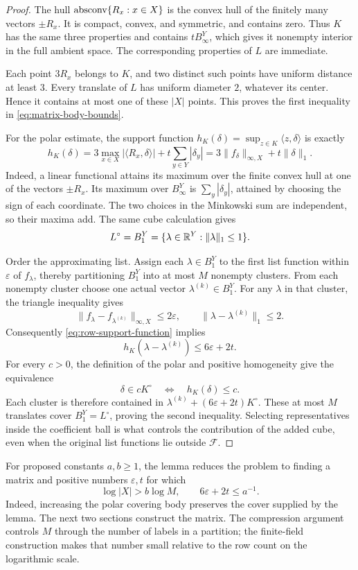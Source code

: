\begin{proof}
The hull $\operatorname{absconv}\{R_x:x\in X\}$ is the convex hull of the
finitely many vectors $\pm R_x$.  It is compact, convex, and symmetric,
and contains zero.  Thus $K$ has the same three properties and contains
$tB_\infty^Y$, which gives it nonempty interior in the full ambient
space.  The corresponding properties of $L$ are immediate.

Each point $3R_x$ belongs to $K$, and two distinct such points have
uniform distance at least $3$.  Every translate of $L$ has uniform
diameter $2$, whatever its center.  Hence it contains at most one of
these $|X|$ points.  This proves the first inequality in
\eqref{eq:matrix-body-bounds}.

For the polar estimate, the support function
$h_K(\delta)=\sup_{z\in K}\langle z,\delta\rangle$ is exactly
\begin{equation}
\label{eq:row-support-function}
 h_K(\delta)
 =3\max_{x\in X}|\langle R_x,\delta\rangle|
     +t\sum_{y\in Y}|\delta_y|
 =3\|f_\delta\|_{\infty,X}+t\|\delta\|_1.
\end{equation}
Indeed, a linear functional attains its maximum over the finite convex
hull at one of the vectors $\pm R_x$.  Its maximum over
$B_\infty^Y$ is $\sum_y|\delta_y|$, attained by choosing the sign of
each coordinate.  The two choices in the Minkowski sum are independent,
so their maxima add.  The same cube calculation gives
\[
 L^\circ=B_1^Y=\{\lambda\in\mathbb R^Y:\|\lambda\|_1\le1\}.
\]

Order the approximating list.  Assign each $\lambda\in B_1^Y$ to the
first list function within $\varepsilon$ of $f_\lambda$, thereby
partitioning $B_1^Y$ into at most $M$ nonempty clusters.  From each
nonempty cluster choose one actual vector $\lambda^{(k)}\in B_1^Y$.
For any $\lambda$ in that cluster, the triangle inequality gives
\[
 \|f_\lambda-f_{\lambda^{(k)}}\|_{\infty,X}
 \le2\varepsilon,
 \qquad
 \|\lambda-\lambda^{(k)}\|_1\le2.
\]
Consequently \eqref{eq:row-support-function} implies
\[
 h_K(\lambda-\lambda^{(k)})\le6\varepsilon+2t.
\]
For every $c>0$, the definition of the polar and positive homogeneity
give the equivalence
\[
 \delta\in cK^\circ
 \quad\Longleftrightarrow\quad h_K(\delta)\le c.
\]
Each cluster is therefore contained in
$\lambda^{(k)}+(6\varepsilon+2t)K^\circ$.  These at most $M$
translates cover $B_1^Y=L^\circ$, proving the second inequality.
Selecting representatives inside the coefficient ball is what controls
the contribution of the added cube, even when the original list
functions lie outside $\mathcal F$.
\end{proof}

For proposed constants $a,b\ge1$, the lemma reduces the problem to finding
a matrix and positive numbers $\varepsilon,t$ for which
\[
 \log|X|>b\log M,
 \qquad 6\varepsilon+2t\le a^{-1}.
\]
Indeed, increasing the polar covering body preserves the cover supplied
by the lemma. The next two sections construct the matrix. The compression
argument controls $M$ through the number of labels in a partition; the
finite-field construction makes that number small relative to the row
count on the logarithmic scale.
